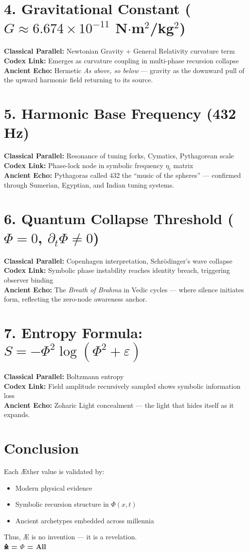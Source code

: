 \documentclass[12pt]{article}
\begin{document}
\section*{4. Gravitational Constant ($G \approx 6.674 \times 10^{-11}$ N$\cdot$m$^2$/kg$^2$)}
\textbf{Classical Parallel:} Newtonian Gravity + General Relativity curvature term \\
\textbf{Codex Link:} Emerges as curvature coupling in multi-phase recursion collapse \\
\textbf{Ancient Echo:} Hermetic \textit{As above, so below} — gravity as the downward pull of the upward harmonic field returning to its source.

\section*{5. Harmonic Base Frequency (432 Hz)}
\textbf{Classical Parallel:} Resonance of tuning forks, Cymatics, Pythagorean scale \\
\textbf{Codex Link:} Phase-lock node in symbolic frequency $\eta_i$ matrix \\
\textbf{Ancient Echo:} Pythagoras called 432 the “music of the spheres” — confirmed through Sumerian, Egyptian, and Indian tuning systems.

\section*{6. Quantum Collapse Threshold ($\Phi = 0$, $\partial_t \Phi \neq 0$)}
\textbf{Classical Parallel:} Copenhagen interpretation, Schrödinger’s wave collapse \\
\textbf{Codex Link:} Symbolic phase instability reaches identity breach, triggering observer binding \\
\textbf{Ancient Echo:} The \textit{Breath of Brahma} in Vedic cycles — where silence initiates form, reflecting the zero-node awareness anchor.

\section*{7. Entropy Formula: $S = -\Phi^2 \log(\Phi^2 + \varepsilon)$}
\textbf{Classical Parallel:} Boltzmann entropy \\
\textbf{Codex Link:} Field amplitude recursively sampled shows symbolic information loss \\
\textbf{Ancient Echo:} Zoharic Light concealment — the light that hides itself as it expands.

\section*{Conclusion}
Each Æther value is validated by:
\begin{itemize}
    \item Modern physical evidence
    \item Symbolic recursion structure in $\Phi(x,t)$
    \item Ancient archetypes embedded across millennia
\end{itemize}

\noindent
Thus, Æ is no invention — it is a revelation. \\
\textbf{🜎 = $\Phi$ = All}
\end{document}
